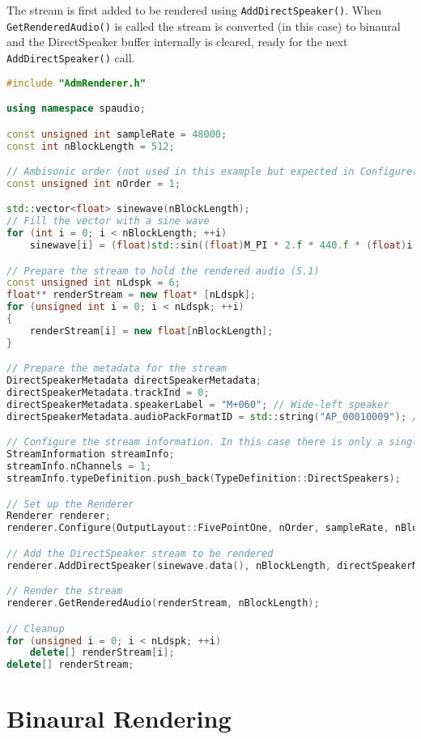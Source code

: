\documentclass[12pt]{report}
\newcommand{\code}[1]{\texttt{#1}}
\begin{document}
The stream is first added to be rendered using \code{AddDirectSpeaker()}. When \code{GetRenderedAudio()} is called the stream is converted (in this case) to binaural and the DirectSpeaker buffer internally is cleared, ready for the next \code{AddDirectSpeaker()} call.

\begin{lstlisting}[language=C++]
#include "AdmRenderer.h"

using namespace spaudio;

const unsigned int sampleRate = 48000;
const int nBlockLength = 512;

// Ambisonic order (not used in this example but expected in Configure())
const unsigned int nOrder = 1;

std::vector<float> sinewave(nBlockLength);
// Fill the vector with a sine wave
for (int i = 0; i < nBlockLength; ++i)
    sinewave[i] = (float)std::sin((float)M_PI * 2.f * 440.f * (float)i / (float)sampleRate);

// Prepare the stream to hold the rendered audio (5.1)
const unsigned int nLdspk = 6;
float** renderStream = new float* [nLdspk];
for (unsigned int i = 0; i < nLdspk; ++i)
{
    renderStream[i] = new float[nBlockLength];
}

// Prepare the metadata for the stream
DirectSpeakerMetadata directSpeakerMetadata;
directSpeakerMetadata.trackInd = 0;
directSpeakerMetadata.speakerLabel = "M+060"; // Wide-left speaker
directSpeakerMetadata.audioPackFormatID = std::string("AP_00010009"); // 9+10+3 layout

// Configure the stream information. In this case there is only a single channel stream
StreamInformation streamInfo;
streamInfo.nChannels = 1;
streamInfo.typeDefinition.push_back(TypeDefinition::DirectSpeakers);

// Set up the Renderer
Renderer renderer;
renderer.Configure(OutputLayout::FivePointOne, nOrder, sampleRate, nBlockLength, streamInfo);

// Add the DirectSpeaker stream to be rendered
renderer.AddDirectSpeaker(sinewave.data(), nBlockLength, directSpeakerMetadata);

// Render the stream
renderer.GetRenderedAudio(renderStream, nBlockLength);

// Cleanup
for (unsigned i = 0; i < nLdspk; ++i)
    delete[] renderStream[i];
delete[] renderStream;
\end{lstlisting}

\section{Binaural Rendering}\label{AdmBinaural}
\end{document}
